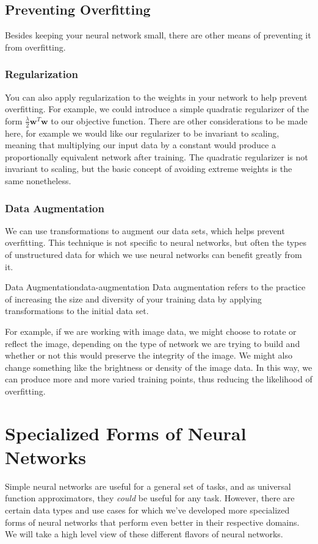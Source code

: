 \subsection{Preventing Overfitting}
Besides keeping your neural network small, there are other means of preventing it from overfitting.

\subsubsection{Regularization}
You can also apply regularization to the weights in your network to help prevent overfitting. For example, we could introduce a simple quadratic regularizer of the form $\frac{\lambda}{2} \textbf{w}^{T}\textbf{w}$ to our objective function. There are other considerations to be made here, for example we would like our regularizer to be invariant to scaling, meaning that multiplying our input data by a constant would produce a proportionally equivalent network after training. The quadratic regularizer is not invariant to scaling, but the basic concept of avoiding extreme weights is the same nonetheless.

\subsubsection{Data Augmentation}
We can use transformations to augment our data sets, which helps prevent overfitting. This technique is not specific to neural networks, but often the types of unstructured data for which we use neural networks can benefit greatly from it.
\begin{definition}{Data Augmentation}{data-augmentation}
Data augmentation refers to the practice of increasing the size and diversity of your training data by applying transformations to the initial data set.
\end{definition}
For example, if we are working with image data, we might choose to rotate or reflect the image, depending on the type of network we are trying to build and whether or not this would preserve the integrity of the image. We might also change something like the brightness or density of the image data. In this way, we can produce more and more varied training points, thus reducing the likelihood of overfitting.

\section{Specialized Forms of Neural Networks}
Simple neural networks are useful for a general set of tasks, and as universal function approximators, they \textit{could} be useful for any task. However, there are certain data types and use cases for which we've developed more specialized forms of neural networks that perform even better in their respective domains. We will take a high level view of these different flavors of neural networks.

